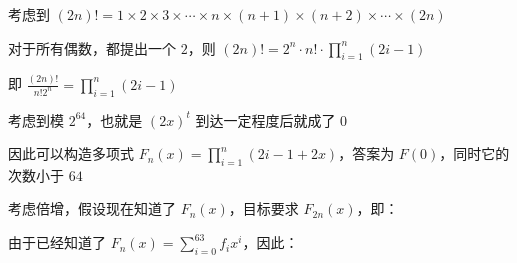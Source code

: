 
考虑到 $(2n)!=1 \times 2 \times 3 \times \cdots \times n \times (n+1) \times (n+2) \times \cdots \times (2n)$

对于所有偶数，都提出一个 $2$，则 $(2n)!=2^n \cdot n! \cdot \prod_{i=1}^{n}(2i-1)$

即 $\frac{(2n)!}{n!2^{n}}=\prod_{i=1}^{n}(2i-1)$

考虑到模 $2^{64}$，也就是 $(2x)^t$ 到达一定程度后就成了 $0$

因此可以构造多项式 $F_n(x)=\prod_{i=1}^{n}(2i-1+2x)$，答案为 $F(0)$，同时它的次数小于 $64$

考虑倍增，假设现在知道了 $F_n(x)$，目标要求 $F_{2n}(x)$，即：

由于已经知道了 $F_n(x)=\sum_{i=0}^{63}f_ix^i$，因此：